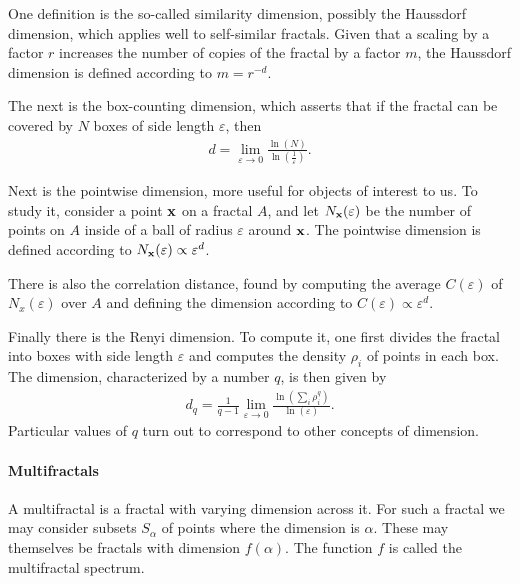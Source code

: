 One definition is the so-called similarity dimension, possibly the Haussdorf dimension, which applies well to self-similar fractals. Given that a scaling by a factor $r$ increases the number of copies of the fractal by a factor $m$, the Haussdorf dimension is defined according to $m = r^{-d}$. 

The next is the box-counting dimension, which asserts that if the fractal can be covered by $N$ boxes of side length $\varepsilon$, then
\begin{align*}
	d = \lim\limits_{\varepsilon\to 0}\frac{\ln(N)}{\ln(\frac{1}{\varepsilon})}.
\end{align*}

Next is the pointwise dimension, more useful for objects of interest to us. To study it, consider a point $\vb{x}$ on a fractal $A$, and let $N_{\vb{x}}(\varepsilon)$ be the number of points on $A$ inside of a ball of radius $\varepsilon$ around $\vb{x}$. The pointwise dimension is defined according to $N_{\vb{x}}(\varepsilon) \propto \varepsilon^{d}$.

There is also the correlation distance, found by computing the average $C(\varepsilon)$ of $N_{x}(\varepsilon)$ over $A$ and defining the dimension according to $C(\varepsilon) \propto \varepsilon^{d}$.

Finally there is the Renyi dimension. To compute it, one first divides the fractal into boxes with side length $\varepsilon$ and computes the density $\rho_{i}$ of points in each box. The dimension, characterized by a number $q$, is then given by
\begin{align*}
	d_{q} = \frac{1}{q - 1}\lim\limits_{\varepsilon\to 0}\frac{\ln(\sum\limits_{i}\rho_{i}^{q})}{\ln(\varepsilon)}.
\end{align*}
Particular values of $q$ turn out to correspond to other concepts of dimension.

\paragraph{Multifractals}
A multifractal is a fractal with varying dimension across it. For such a fractal we may consider subsets $S_{\alpha}$ of points where the dimension is $\alpha$. These may themselves be fractals with dimension $f(\alpha)$. The function $f$ is called the multifractal spectrum.
